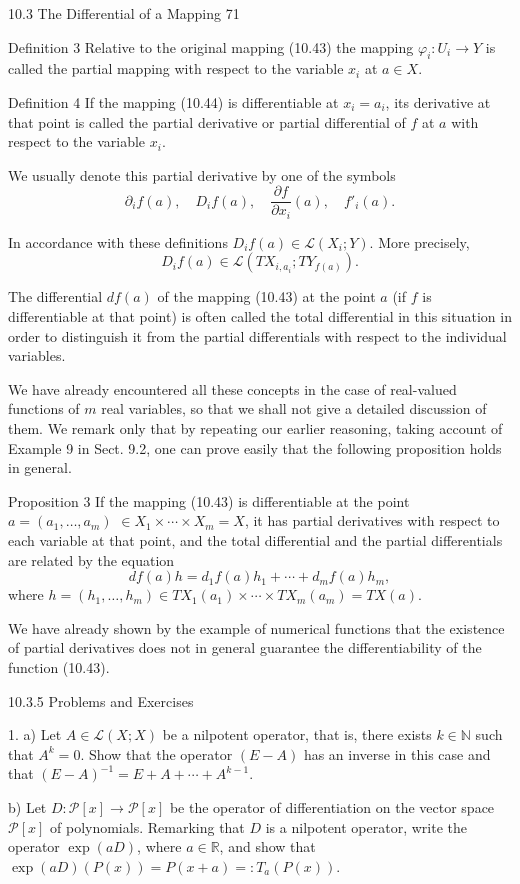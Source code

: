 10.3 The Differential of a Mapping 71

Definition 3 Relative to the original mapping (10.43) the mapping $\varphi_i : U_i \rightarrow Y$ is
called the partial mapping with respect to the variable $x_i$ at $a \in X$.

Definition 4 If the mapping (10.44) is differentiable at $x_i = a_i$, its derivative at that
point is called the partial derivative or partial differential of $f$ at $a$ with respect to
the variable $x_i$.

We usually denote this partial derivative by one of the symbols
$$
\partial_i f(a), \quad D_i f(a), \quad \frac{\partial f}{\partial x_i}(a), \quad f'_i(a).
$$

In accordance with these definitions $D_i f(a) \in \mathcal{L}(X_i; Y)$. More precisely,
$$
D_i f(a) \in \mathcal{L}(TX_{i,a_i}; TY_{f(a)}).
$$

The differential $df(a)$ of the mapping (10.43) at the point $a$ (if $f$ is differentiable at that point) is often called the total differential in this situation in order to
distinguish it from the partial differentials with respect to the individual variables.

We have already encountered all these concepts in the case of real-valued functions of $m$ real variables, so that we shall not give a detailed discussion of them. We
remark only that by repeating our earlier reasoning, taking account of Example 9 in
Sect. 9.2, one can prove easily that the following proposition holds in general.

Proposition 3 If the mapping (10.43) is differentiable at the point $a = (a_1, \dots, a_m)$
$\in X_1 \times \cdots \times X_m = X$, it has partial derivatives with respect to each variable at
that point, and the total differential and the partial differentials are related by the
equation
$$
df(a)h = d_1 f(a)h_1 + \cdots + d_m f(a)h_m, \tag{10.45}
$$
where $h = (h_1, \dots, h_m) \in TX_1(a_1) \times \cdots \times TX_m(a_m) = TX(a)$.

We have already shown by the example of numerical functions that the existence
of partial derivatives does not in general guarantee the differentiability of the function (10.43).

10.3.5 Problems and Exercises

1. a) Let $A \in \mathcal{L}(X; X)$ be a nilpotent operator, that is, there exists $k \in \mathbb{N}$ such
that $A^k = 0$. Show that the operator $(E - A)$ has an inverse in this case and that
$(E - A)^{-1} = E + A + \cdots + A^{k-1}.$

b) Let $D : \mathcal{P}[x] \rightarrow \mathcal{P}[x]$ be the operator of differentiation on the vector space
$\mathcal{P}[x]$ of polynomials. Remarking that $D$ is a nilpotent operator, write the operator
$\exp(aD)$, where $a \in \mathbb{R}$, and show that $\exp(aD)(P(x)) = P(x + a) =: T_a(P(x)).$
